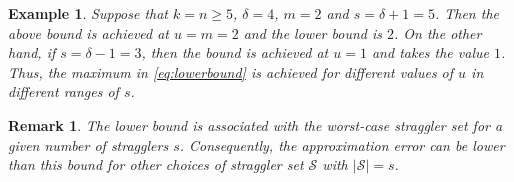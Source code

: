 \documentclass[journal,draftcls,onecolumn]{IEEEtran}
\theoremstyle{mystyle}
\newtheorem{remark}{Remark}
\newtheorem{example}{Example}
\newcommand{\bfB}{\mathbf{B}}
\newcommand{\floor}[1]{\left\lfloor #1\right\rfloor}
\newcommand{\aditya}[1]{\marginpar{+}{\bf Aditya's remark}: {\em #1}}
\newcommand{\sifat}[1]{\marginpar{+}{\bf Sifat's remark}: {\em #1}}
\begin{document}

 





\begin{example}
Suppose that $k=n \ge 5$, $\delta = 4$, $m=2$ and $s = \delta +1 =5$. Then the above bound is achieved at $u=m=2$ and the lower bound is $2$. On the other hand, if $s = \delta-1 = 3$, then the bound is achieved at $u=1$ and takes the value $1$. Thus, the maximum in \eqref{eq:lowerbound} is achieved for different values of $u$ in different ranges of $s$.
\end{example}

\begin{remark}
The lower bound is associated with the worst-case straggler set for a given number of stragglers $s$. Consequently, the approximation error can be lower than this bound for other choices of straggler set $\mathcal{S}$ with $|\mathcal{S}| = s$. 
\end{remark}
\end{document}
